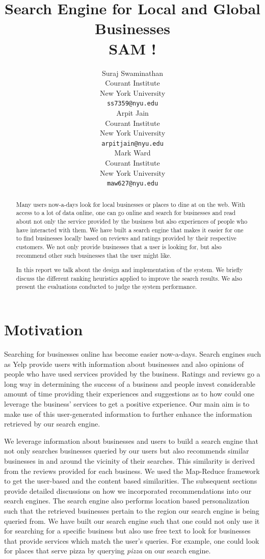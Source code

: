 \documentclass[paper=letter, fontsize=15pt]{article} %
\title{Search Engine for Local and Global Businesses \\ SAM ! }
\author{
Suraj Swaminathan \\
Courant Institute\\
New York University \\
\texttt{ss7359@nyu.edu} \\
\And
Arpit Jain \\
Courant Institute\\
New York University \\
\texttt{arpitjain@nyu.edu} \\
\And
Mark Ward \\
Courant Institute \\
New York University \\
\texttt{maw627@nyu.edu} \\
}
\begin{document}
\maketitle

\begin{abstract}
Many users now-a-days look for local businesses or places to dine at on the web. With access to a lot of data online, one can go online and search for businesses and read about not only the service provided by the business but also experiences of people who have interacted with them. We have built a search engine that makes it easier for one to find businesses locally based on reviews and ratings provided by their respective customers. We not only provide businesses that a user is looking for, but also recommend other such businesses that the user might like. 

In this report we talk about the design and implementation of the system. We briefly discuss the different ranking heuristics applied to improve the search results. We also present the evaluations conducted to judge the system performance. 
\end{abstract}

\section{Motivation}

Searching for businesses online has become easier now-a-days. Search engines such as Yelp \cite{yel} provide users with information about businesses and also opinions of people who have used services provided by the business. Ratings and reviews go a long way in determining the success of a business and people invest considerable amount of time providing their experiences and suggestions as to how could one leverage the business' services to get a positive experience. Our main aim is to make use of this user-generated information to further enhance the information retrieved by our search engine. 


We leverage information about businesses and users to build a search engine that not only searches businesses queried by our users but also recommends similar businesses in and around the vicinity of their searches. This similarity is derived from the reviews provided for each business. We used the Map-Reduce\cite{smap} framework to get the user-based and the content based similarities. The subsequent sections provide detailed discussions on how we incorporated recommendations into our search engines. The search engine also performs location based personalization such that the retrieved businesses pertain to the region our search engine is being queried from.
We have built our search engine such that one could not only use it for searching for a specific business but also use free text to look for businesses that provide services which match the user's queries. For example, one could look for places that serve pizza by querying \textit{pizza} on our search engine. 
\end{document}
